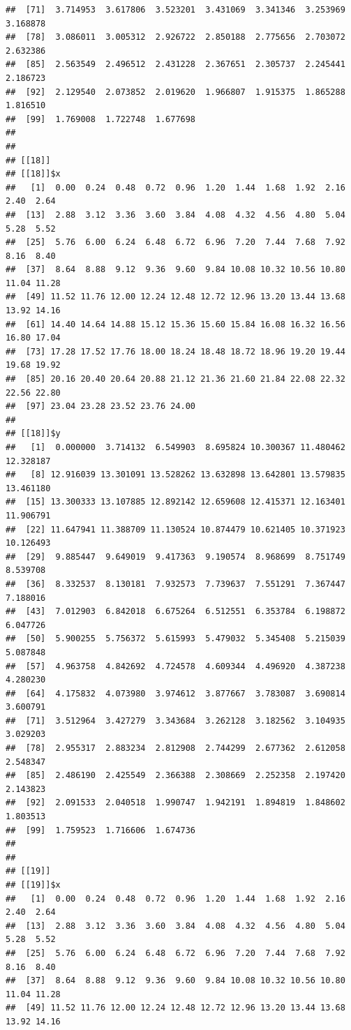 \documentclass[
  ignorenonframetext,
]{beamer}
\begin{document}
\begin{frame}[fragile]{}
\begin{verbatim}
##  [71]  3.714953  3.617806  3.523201  3.431069  3.341346  3.253969  3.168878
##  [78]  3.086011  3.005312  2.926722  2.850188  2.775656  2.703072  2.632386
##  [85]  2.563549  2.496512  2.431228  2.367651  2.305737  2.245441  2.186723
##  [92]  2.129540  2.073852  2.019620  1.966807  1.915375  1.865288  1.816510
##  [99]  1.769008  1.722748  1.677698
## 
## 
## [[18]]
## [[18]]$x
##   [1]  0.00  0.24  0.48  0.72  0.96  1.20  1.44  1.68  1.92  2.16  2.40  2.64
##  [13]  2.88  3.12  3.36  3.60  3.84  4.08  4.32  4.56  4.80  5.04  5.28  5.52
##  [25]  5.76  6.00  6.24  6.48  6.72  6.96  7.20  7.44  7.68  7.92  8.16  8.40
##  [37]  8.64  8.88  9.12  9.36  9.60  9.84 10.08 10.32 10.56 10.80 11.04 11.28
##  [49] 11.52 11.76 12.00 12.24 12.48 12.72 12.96 13.20 13.44 13.68 13.92 14.16
##  [61] 14.40 14.64 14.88 15.12 15.36 15.60 15.84 16.08 16.32 16.56 16.80 17.04
##  [73] 17.28 17.52 17.76 18.00 18.24 18.48 18.72 18.96 19.20 19.44 19.68 19.92
##  [85] 20.16 20.40 20.64 20.88 21.12 21.36 21.60 21.84 22.08 22.32 22.56 22.80
##  [97] 23.04 23.28 23.52 23.76 24.00
## 
## [[18]]$y
##   [1]  0.000000  3.714132  6.549903  8.695824 10.300367 11.480462 12.328187
##   [8] 12.916039 13.301091 13.528262 13.632898 13.642801 13.579835 13.461180
##  [15] 13.300333 13.107885 12.892142 12.659608 12.415371 12.163401 11.906791
##  [22] 11.647941 11.388709 11.130524 10.874479 10.621405 10.371923 10.126493
##  [29]  9.885447  9.649019  9.417363  9.190574  8.968699  8.751749  8.539708
##  [36]  8.332537  8.130181  7.932573  7.739637  7.551291  7.367447  7.188016
##  [43]  7.012903  6.842018  6.675264  6.512551  6.353784  6.198872  6.047726
##  [50]  5.900255  5.756372  5.615993  5.479032  5.345408  5.215039  5.087848
##  [57]  4.963758  4.842692  4.724578  4.609344  4.496920  4.387238  4.280230
##  [64]  4.175832  4.073980  3.974612  3.877667  3.783087  3.690814  3.600791
##  [71]  3.512964  3.427279  3.343684  3.262128  3.182562  3.104935  3.029203
##  [78]  2.955317  2.883234  2.812908  2.744299  2.677362  2.612058  2.548347
##  [85]  2.486190  2.425549  2.366388  2.308669  2.252358  2.197420  2.143823
##  [92]  2.091533  2.040518  1.990747  1.942191  1.894819  1.848602  1.803513
##  [99]  1.759523  1.716606  1.674736
## 
## 
## [[19]]
## [[19]]$x
##   [1]  0.00  0.24  0.48  0.72  0.96  1.20  1.44  1.68  1.92  2.16  2.40  2.64
##  [13]  2.88  3.12  3.36  3.60  3.84  4.08  4.32  4.56  4.80  5.04  5.28  5.52
##  [25]  5.76  6.00  6.24  6.48  6.72  6.96  7.20  7.44  7.68  7.92  8.16  8.40
##  [37]  8.64  8.88  9.12  9.36  9.60  9.84 10.08 10.32 10.56 10.80 11.04 11.28
##  [49] 11.52 11.76 12.00 12.24 12.48 12.72 12.96 13.20 13.44 13.68 13.92 14.16

\end{verbatim}
\end{frame}
\end{document}
